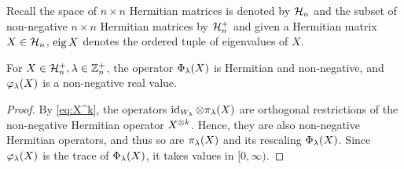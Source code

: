 \documentclass[notitlepage, 11pt, letterpaper]{amsart}
\begin{document}
Recall the space of $n\times n$ Hermitian matrices is denoted by $\mathcal H_{n}$ and the subset of non-negative $n\times n$ Hermitian matrices by $\mathcal H^{+}_{n}$ and given a Hermitian matrix $X \in \mathcal H_{n}$, $\operatorname{eig} X$ denotes the ordered tuple of eigenvalues of $X$.

\begin{prop}
    For $X \in \mathcal H^{+}_{n}, \lambda \in \mathbb Z^{+}_{n}$, the operator $\Phi_\lambda(X)$ is Hermitian and non-negative, and $\varphi_\lambda(X)$ is a non-negative real value.
\end{prop}

\begin{proof}
    By \cref{eq:X^k}, the operators $\operatorname{id}_{W_\lambda} \otimes \pi_\lambda(X)$ are orthogonal restrictions of the non-negative Hermitian operator $X^{\otimes k}$.
    Hence, they are also non-negative Hermitian operators, and thus so are $\pi_\lambda(X)$ and its rescaling $\Phi_\lambda(X)$.
    Since $\varphi_\lambda(X)$ is the trace of $\Phi_\lambda(X)$, it takes values in $[0, \infty)$.
\end{proof}
\end{document}
